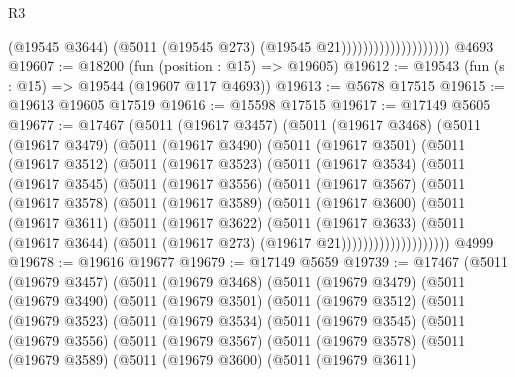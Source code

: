 \begin{lexlean}{R3}
\begin{coremodule}
                                        (@19545 @3644)
                                        (@5011 (@19545 @273) (@19545 @21))))))))))))))))))))
    @4693
@19607 := @18200 (fun (position : @15) => @19605)
@19612 := @19543 (fun (s : @15) => @19544 (@19607 @117 @4693))
@19613 := @5678 @17515
@19615 := @19613 @19605 @17519
@19616 := @15598 @17515
@19617 := @17149 @5605
@19677 := @17467
    (@5011
      (@19617 @3457)
      (@5011
        (@19617 @3468)
        (@5011
          (@19617 @3479)
          (@5011
            (@19617 @3490)
            (@5011
              (@19617 @3501)
              (@5011
                (@19617 @3512)
                (@5011
                  (@19617 @3523)
                  (@5011
                    (@19617 @3534)
                    (@5011
                      (@19617 @3545)
                      (@5011
                        (@19617 @3556)
                        (@5011
                          (@19617 @3567)
                          (@5011
                            (@19617 @3578)
                            (@5011
                              (@19617 @3589)
                              (@5011
                                (@19617 @3600)
                                (@5011
                                  (@19617 @3611)
                                  (@5011
                                    (@19617 @3622)
                                    (@5011
                                      (@19617 @3633)
                                      (@5011
                                        (@19617 @3644)
                                        (@5011 (@19617 @273) (@19617 @21))))))))))))))))))))
    @4999
@19678 := @19616 @19677
@19679 := @17149 @5659
@19739 := @17467
    (@5011
      (@19679 @3457)
      (@5011
        (@19679 @3468)
        (@5011
          (@19679 @3479)
          (@5011
            (@19679 @3490)
            (@5011
              (@19679 @3501)
              (@5011
                (@19679 @3512)
                (@5011
                  (@19679 @3523)
                  (@5011
                    (@19679 @3534)
                    (@5011
                      (@19679 @3545)
                      (@5011
                        (@19679 @3556)
                        (@5011
                          (@19679 @3567)
                          (@5011
                            (@19679 @3578)
                            (@5011
                              (@19679 @3589)
                              (@5011
                                (@19679 @3600)
                                (@5011
                                  (@19679 @3611)

\end{coremodule}
\end{lexlean}
